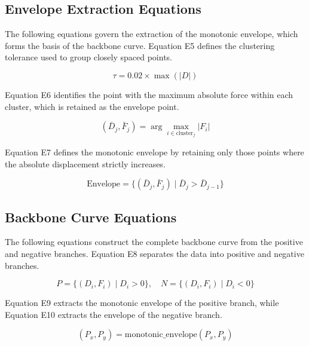 \documentclass[11pt,a4paper]{article}
\begin{document}
\subsection{Envelope Extraction Equations}

The following equations govern the extraction of the monotonic envelope, which forms the basis of the backbone curve. Equation E5 defines the clustering tolerance used to group closely spaced points.

\begin{equation}
\tau = 0.02 \times \max(|D|)
\tag{E5}
\label{eq:E5}
\end{equation}

Equation E6 identifies the point with the maximum absolute force within each cluster, which is retained as the envelope point.

\begin{equation}
(\bar{D}_j, \bar{F}_j) = \arg\max_{i \in \text{cluster}_j} |F_i|
\tag{E6}
\label{eq:E6}
\end{equation}

Equation E7 defines the monotonic envelope by retaining only those points where the absolute displacement strictly increases.

\begin{equation}
\text{Envelope} = \{ (\bar{D}_j, \bar{F}_j) \mid \bar{D}_j > \bar{D}_{j-1} \}
\tag{E7}
\label{eq:E7}
\end{equation}

\subsection{Backbone Curve Equations}

The following equations construct the complete backbone curve from the positive and negative branches. Equation E8 separates the data into positive and negative branches.

\begin{equation}
P = \{(D_i, F_i) \mid D_i > 0\}, \quad N = \{(D_i, F_i) \mid D_i < 0\}
\tag{E8}
\label{eq:E8}
\end{equation}

Equation E9 extracts the monotonic envelope of the positive branch, while Equation E10 extracts the envelope of the negative branch.

\begin{equation}
(P_x, P_y) = \text{monotonic\_envelope}(P_x, P_y)
\tag{E9}
\label{eq:E9}
\end{equation}
\end{document}
